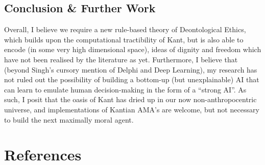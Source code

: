 \documentclass{scrartcl}
\begin{document}
\subsection{Conclusion \& Further Work}
Overall, I believe we require a new rule-based theory of Deontological Ethics, which builds upon the computational tractibility of Kant, but is also able to encode (in some very high dimensional space), ideas of dignity and freedom which have not been realised by the literature as yet. Furthermore, I believe that (beyond Singh's cursory mention of Delphi and Deep Learning), my research has not ruled out the possibility of building a bottom-up (but unexplainable) AI that can learn to emulate human decision-making in the form of a ``strong AI''. As such, I posit that the oasis of Kant has dried up in our now non-anthropocentric universe, and implementations of Kantian AMA's are welcome, but not necessary to build the next maximally moral agent.


\newpage
\section{References}
\printbibliography[heading=none]
\end{document}
